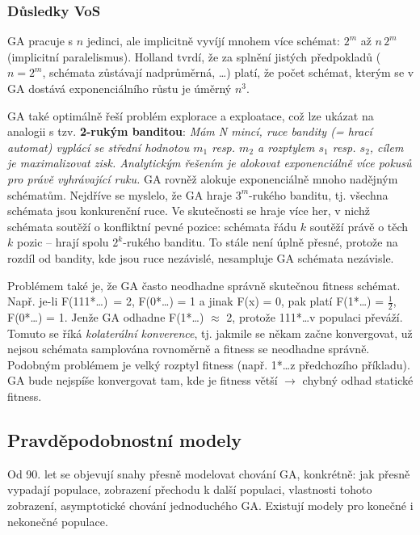 \subsubsection{Důsledky VoS}
GA pracuje s $n$ jedinci, ale implicitně vyvíjí mnohem více schémat: $2^m$ až $n\,2^m$ (implicitní paralelismus). Holland tvrdí, že za splnění jistých předpokladů ($n = 2^m$, schémata zůstávají nadprůměrná, \dots) platí, že počet schémat, kterým se v GA dostává exponenciálního růstu je úměrný $n^3$. 

GA také optimálně řeší problém explorace a exploatace, což lze ukázat na analogii s tzv. \textbf{2-rukým banditou}: \textit{Mám N mincí, ruce bandity (= hrací automat) vyplácí se střední hodnotou $m_1$ resp. $m_2$ a rozptylem $s_1$ resp. $s_2$, cílem je maximalizovat zisk. Analytickým řešením je alokovat exponenciálně více pokusů pro právě vyhrávající ruku.} GA rovněž alokuje exponenciálně mnoho nadějným schématům. Nejdříve se myslelo, že GA hraje $3^m$-rukého banditu, tj. všechna schémata jsou konkurenční ruce. Ve skutečnosti se hraje více her, v nichž schémata soutěží o konfliktní pevné pozice: schémata řádu $k$ soutěží právě o těch $k$ pozic -- hrají spolu $2^k$-rukého banditu. To stále není úplně přesné, protože na rozdíl od bandity, kde jsou ruce nezávislé, nesampluje GA schémata nezávisle.

Problémem také je, že GA často neodhadne správně skutečnou fitness schémat. Např. je-li F(111*\dots*)~= 2, F(0*\dots*) = 1 a jinak F(x) = 0, pak platí F(1*\dots*) = $\frac{1}{2}$, F(0*\dots*) = 1. Jenže GA odhadne F(1*\dots*) $\approx$ 2, protože 111*\dots* v populaci převáží. Tomuto se říká \textit{kolaterální konverence}, tj. jakmile se někam začne konvergovat, už nejsou schémata samplována rovnoměrně a fitness se neodhadne správně. Podobným problémem je velký rozptyl fitness (např. 1*\dots* z předchozího příkladu). GA bude nejspíše konvergovat tam, kde je fitness větší $\rightarrow$ chybný odhad statické fitness.


\subsection{Pravděpodobnostní modely}
Od 90. let se objevují snahy přesně modelovat chování GA, konkrétně: jak přesně vypadají populace, zobrazení přechodu k další populaci, vlastnosti tohoto zobrazení, asymptotické chování jednoduchého GA. Existují modely pro konečné i nekonečné populace.

